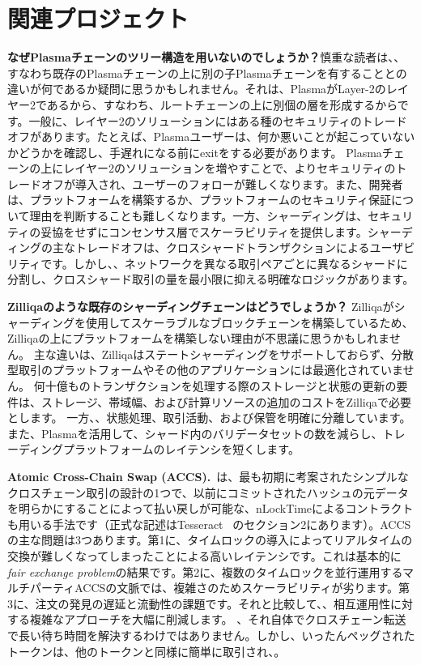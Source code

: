 \section{関連プロジェクト}
\textbf{なぜPlasmaチェーンのツリー構造を用いないのでしょうか？}慎重な読者は、、すなわち既存のPlasmaチェーンの上に別の子Plasmaチェーンを有することとの違いが何であるか疑問に思うかもしれません。それは、PlasmaがLayer-2のレイヤー2であるから、すなわち、ルートチェーンの上に別個の層を形成するからです。一般に、レイヤー2のソリューションにはある種のセキュリティのトレードオフがあります。たとえば、Plasmaユーザーは、何か悪いことが起こっていないかどうかを確認し、手遅れになる前にexitをする必要があります。 Plasmaチェーンの上にレイヤー2のソリューションを増やすことで、よりセキュリティのトレードオフが導入され、ユーザーのフォローが難しくなります。また、開発者は、プラットフォームを構築するか、プラットフォームのセキュリティ保証について理由を判断することも難しくなります。一方、シャーディングは、セキュリティの妥協をせずにコンセンサス層でスケーラビリティを提供します。シャーディングの主なトレードオフは、クロスシャードトランザクションによるユーザビリティです。しかし、、ネットワークを異なる取引ペアごとに異なるシャードに分割し、クロスシャード取引の量を最小限に抑える明確なロジックがあります。

\textbf{Zilliqaのような既存のシャーディングチェーンはどうでしょうか？ } Zilliqaがシャーディングを使用してスケーラブルなブロックチェーンを構築しているため、Zilliqaの上にプラットフォームを構築しない理由が不思議に思うかもしれません。 主な違いは、Zilliqaはステートシャーディングをサポートしておらず、分散型取引のプラットフォームやその他のアプリケーションには最適化されていません。 何十億ものトランザクションを処理する際のストレージと状態の更新の要件は、ストレージ、帯域幅、および計算リソースの追加のコストをZilliqaで必要とします。 一方、、状態処理、取引活動、および保管を明確に分離しています。 また、Plasmaを活用して、シャード内のバリデータセットの数を減らし、トレーディングプラットフォームのレイテンシを短くします。

\textbf{Atomic Cross-Chain Swap (ACCS).}~\cite{atomic-swap-wiki}は、最も初期に考案されたシンプルなクロスチェーン取引の設計の1つで、以前にコミットされたハッシュの元データを明らかにすることによって払い戻しが可能な、nLockTimeによるコントラクトも用いる手法です（正式な記述はTesseract ~\cite{tesseract}のセクション2にあります）。ACCSの主な問題は3つあります。第1に、タイムロックの導入によってリアルタイムの交換が難しくなってしまったことによる高いレイテンシです。これは基本的に\textit{fair exchange problem}\cite{fair-exchange-impossibility}の結果です。第2に、複数のタイムロックを並行運用するマルチパーティACCSの文脈では、複雑さのためスケーラビリティが劣ります。第3に、注文の発見の遅延と流動性の課題です。それと比較して、、相互運用性に対する複雑なアプローチを大幅に削減します。 、それ自体でクロスチェーン転送で長い待ち時間を解決するわけではありません。しかし、いったんペッグされたトークンは、他のトークンと同様に簡単に取引され、。

